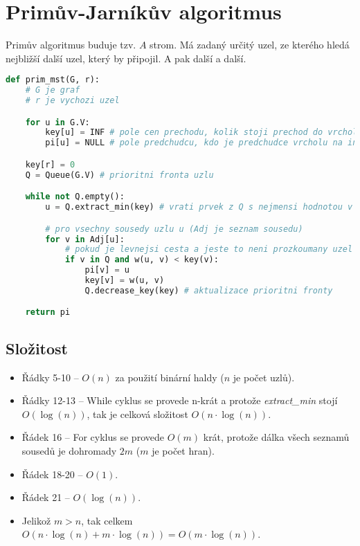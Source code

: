 
\section{Primův-Jarníkův algoritmus}

Primův algoritmus buduje tzv. $A$ strom. Má zadaný určitý uzel, ze kterého hledá nejbližší další uzel, který by připojil. A pak další a další.

\bigskip\noindent\begin{minipage}{\linewidth}
\begin{lstlisting}[language=Python, caption={Primův algoritmus.}]
def prim_mst(G, r):
    # G je graf
    # r je vychozi uzel

    for u in G.V:
        key[u] = INF # pole cen prechodu, kolik stoji prechod do vrcholu na indexu
        pi[u] = NULL # pole predchudcu, kdo je predchudce vrcholu na indexu

    key[r] = 0
    Q = Queue(G.V) # prioritni fronta uzlu

    while not Q.empty():
        u = Q.extract_min(key) # vrati prvek z Q s nejmensi hodnotou v key

        # pro vsechny sousedy uzlu u (Adj je seznam sousedu)
        for v in Adj[u]:
            # pokud je levnejsi cesta a jeste to neni prozkoumany uzel
            if v in Q and w(u, v) < key(v):
                pi[v] = u
                key[v] = w(u, v)
                Q.decrease_key(key) # aktualizace prioritni fronty

    return pi
\end{lstlisting}
\end{minipage}

\subsection*{Složitost}

\begin{itemize}
    \item Řádky 5-10 -- $O(n)$ za použití binární haldy ($n$ je počet uzlů).
    \item Řádky 12-13 -- While cyklus se provede n-krát a protože \textit{extract\_min} stojí $O(\log(n))$, tak je celková složitost $O(n \cdot \log(n))$.
    \item Řádek 16 -- For cyklus se provede $O(m)$ krát, protože dálka všech seznamů sousedů je dohromady $2m$ ($m$ je počet hran).
    \item Řádek 18-20 -- $O(1)$.
    \item Řádek 21 -- $O(\log(n))$.
    \item Jelikož $m > n$, tak celkem $O(n \cdot \log(n) + m \cdot \log(n)) = O(m \cdot \log(n))$.
\end{itemize}


